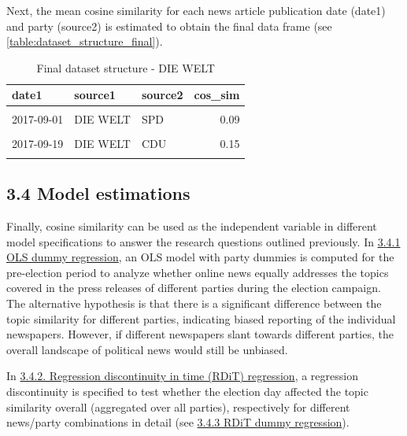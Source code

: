 \documentclass[
  12pt,
]{article}
\begin{document}
Next, the mean cosine similarity for each news article publication date
(date1) and party (source2) is estimated to obtain the final data frame
(see \autoref{table:dataset_structure_final}).

\begin{table}[H]

\caption{\label{tab:Dataset structure final}Final dataset structure - DIE WELT \label{table:dataset_structure_final}}
\centering
\fontsize{7}{9}\selectfont
\begin{tabular}[t]{lllr}
\toprule
date1 & source1 & source2 & cos\_sim\\
\midrule
\cellcolor{gray!6}{2017-08-10} & \cellcolor{gray!6}{DIE WELT} & \cellcolor{gray!6}{AfD} & \cellcolor{gray!6}{0.16}\\
2017-09-01 & DIE WELT & SPD & 0.09\\
\cellcolor{gray!6}{2017-08-25} & \cellcolor{gray!6}{DIE WELT} & \cellcolor{gray!6}{FDP} & \cellcolor{gray!6}{0.14}\\
2017-09-19 & DIE WELT & CDU & 0.15\\
\cellcolor{gray!6}{2017-11-24} & \cellcolor{gray!6}{DIE WELT} & \cellcolor{gray!6}{DIE LINKE} & \cellcolor{gray!6}{0.11}\\
\bottomrule
\end{tabular}
\end{table}

\hypertarget{model-estimations}{%
\subsection{3.4 Model estimations}\label{model-estimations}}

Finally, cosine similarity can be used as the independent variable in
different model specifications to answer the research questions outlined
previously. In \protect\hyperlink{ols-dummy-regression}{3.4.1 OLS dummy
regression}, an OLS model with party dummies is computed for the
pre-election period to analyze whether online news equally addresses the
topics covered in the press releases of different parties during the
election campaign. The alternative hypothesis is that there is a
significant difference between the topic similarity for different
parties, indicating biased reporting of the individual newspapers.
However, if different newspapers slant towards different parties, the
overall landscape of political news would still be unbiased.

In \protect\hyperlink{rdit}{3.4.2. Regression discontinuity in time
(RDiT) regression}, a regression discontinuity is specified to test
whether the election day affected the topic similarity overall
(aggregated over all parties), respectively for different news/party
combinations in detail (see \protect\hyperlink{rdit-dummy}{3.4.3 RDiT
dummy regression}).
\end{document}
